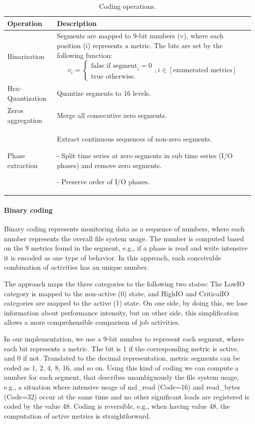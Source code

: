 \documentclass[]{llncs}
\begin{document}
\begin{table}
 \centering
 \begin{tabularx}{\textwidth}{lX}
	 Operation &  Description \\
	 \hline	 Binarization & Segments are mapped to 9-bit numbers (v), where each position (i) represents a metric. The bits are set by the following function:
	 \vbox{
		\begin{equation}
			v_i =
			\begin{cases}
				\text{false if segment}_i = 0\\\text{true otherwise.}
			\end{cases}, i \in [\text{enumerated metrics}]
		\end{equation}
	 } \\
	 \hline
	 Hex-Quantization & Quantize segments to 16 levels. \\
	 \hline
	 Zeros aggregation & Merge all consecutive zero segments. \\
	 \hline
	 Phase extraction &  Extract continuous sequences of non-zero segments. \par - Split time series at zero segments in sub time series (I/O phases) and remove zero segments. \par - Preserve order of I/O phases. \\
	 \hline
 \end{tabularx}
 \caption{Coding operations.}
 \label{tab:coding_ops}
\end{table}
\paragraph{Binary coding}
Binary coding represents monitoring data as a sequence of numbers, where each number represents the overall file system usage.
The number is computed based on the 9 metrics found in the segment, e.g., if a phase is read and write intensive it is encoded as one type of behavior.
In this approach, each conceivable combination of activities has an unique number.

The approach maps the three categories to the following two states: The LowIO category is mapped to the non-active (0) state, and HighIO and CriticalIO categories are mapped to the active (1) state.
On one side, by doing this, we lose information about performance intensity, but on other side, this simplification allows a more comprehensible comparison of job activities.

In our implementation, we use a 9-bit number to represent each segment, where each bit represents a metric.
The bit is 1 if the corresponding metric is active, and 0 if not.
Translated to the decimal representation, metric segments can be coded as 1, 2, 4, 8, 16, and so on.
Using this kind of coding we can compute a number for each segment, that describes unambiguously the file system usage, e.g., a situation where intensive usage of md\_read (Code=16) and read\_bytes (Code=32) occur at the same time and no other significant loads are registered is coded by the value 48.
Coding is reversible, e.g., when having value 48, the computation of active metrics is straightforward.
\end{document}
